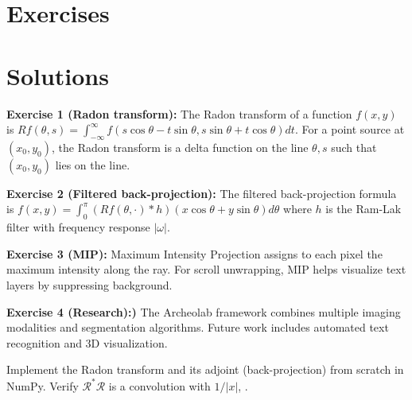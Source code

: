 \section{Exercises}
\section{Solutions}
\label{sec:tom:solutions}

\begin{solution}
\textbf{Exercise 1 (Radon transform):} The Radon transform of a function $f(x,y)$ is $Rf(\theta, s) = \int_{-\infty}^{\infty} f(s\cos\theta - t\sin\theta, s\sin\theta + t\cos\theta) dt$. For a point source at $(x_0, y_0)$, the Radon transform is a delta function on the line $\theta, s$ such that $(x_0, y_0)$ lies on the line.
\end{solution}

\begin{solution}
\textbf{Exercise 2 (Filtered back-projection):} The filtered back-projection formula is $f(x,y) = \int_0^{\pi} (Rf(\theta, \cdot) * h)(x\cos\theta + y\sin\theta) d\theta$ where $h$ is the Ram-Lak filter with frequency response $|\omega|$.
\end{solution}

\begin{solution}
\textbf{Exercise 3 (MIP):} Maximum Intensity Projection assigns to each pixel the maximum intensity along the ray. For scroll unwrapping, MIP helps visualize text layers by suppressing background.
\end{solution}

\begin{solution}
\textbf{Exercise 4 (Research):)} The Archeolab framework combines multiple imaging modalities and segmentation algorithms. Future work includes automated text recognition and 3D visualization.
\end{solution}

\label{sec:tom:exercises}

\begin{exercise}
Implement the Radon transform and its adjoint (back-projection) from scratch in NumPy. Verify $\mathcal{R}^*\mathcal{R}$ is a convolution with $1/|x|$, \cite{foschiatti2025tomography}.
\end{exercise}

